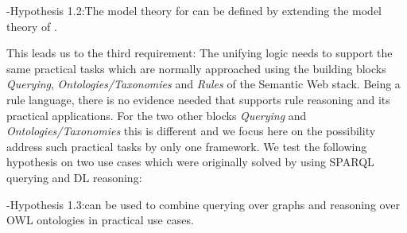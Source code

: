 \hyp{Hypothesis 1.2:}{The model theory for \nthree can be defined by extending the model theory of \rdf.}

This leads us to the third requirement: The unifying logic needs to support the same practical tasks which are normally approached using
the building blocks \emph{Querying}, \emph{Ontologies/Taxonomies} and \emph{Rules} of the Semantic Web stack.
Being a rule language, there is no evidence needed that \nthree supports rule reasoning and its practical applications. 
For the two other blocks 
\emph{Querying} and \emph{Ontologies/Taxonomies} this is different and we focus here on the possibility address such practical tasks by only one framework. 
We test the following hypothesis on two use cases which were originally solved by using SPARQL querying and \owl DL reasoning:
%

\hyp{Hypothesis 1.3:}{\nthreelogic can be used to combine querying over \rdf graphs and reasoning over OWL ontologies in practical use cases.}

